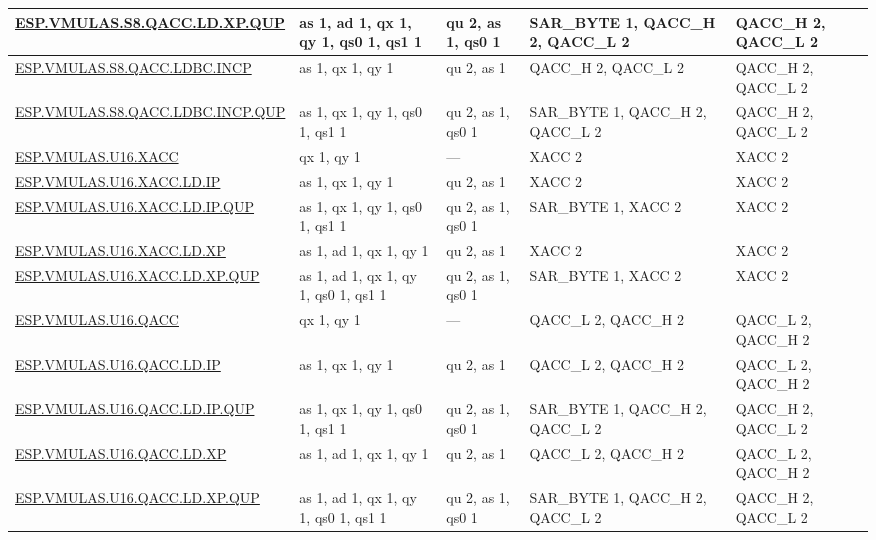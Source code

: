 \begin{longtable}[c]{|l|m{2.5cm}|m{2.5cm}|m{2.5cm}|m{2.5cm}|}
    \hyperref[instruction:ESPVMULASS8QACCLDXPQUP]{ESP.VMULAS.S8.QACC.LD.XP.QUP} & as 1, ad 1, qx 1, qy 1, qs0 1, qs1 1 & qu 2, as 1, qs0 1 & SAR\_BYTE 1, QACC\_H 2, QACC\_L 2 & QACC\_H 2, QACC\_L 2\\\hline
    \hyperref[instruction:ESPVMULASS8QACCLDBCINCP]{ESP.VMULAS.S8.QACC.LDBC.INCP} & as 1, qx 1, qy 1 & qu 2, as 1 & QACC\_H 2, QACC\_L 2 & QACC\_H 2, QACC\_L 2\\\hline
    \hyperref[instruction:ESPVMULASS8QACCLDBCINCPQUP]{ESP.VMULAS.S8.QACC.LDBC.INCP.QUP} & as 1, qx 1, qy 1, qs0 1, qs1 1 & qu 2, as 1, qs0 1 & SAR\_BYTE 1, QACC\_H 2, QACC\_L 2 & QACC\_H 2, QACC\_L 2\\\hline
    \hyperref[instruction:ESPVMULASU16XACC]{ESP.VMULAS.U16.XACC} & qx 1, qy 1 & — & XACC 2 & XACC 2\\\hline
    \hyperref[instruction:ESPVMULASU16XACCLDIP]{ESP.VMULAS.U16.XACC.LD.IP} & as 1, qx 1, qy 1 & qu 2, as 1 & XACC 2 & XACC 2\\\hline
    \hyperref[instruction:ESPVMULASU16XACCLDIPQUP]{ESP.VMULAS.U16.XACC.LD.IP.QUP} & as 1, qx 1, qy 1, qs0 1, qs1 1 & qu 2, as 1, qs0 1 & SAR\_BYTE 1, XACC 2 & XACC 2\\\hline
    \hyperref[instruction:ESPVMULASU16XACCLDXP]{ESP.VMULAS.U16.XACC.LD.XP} & as 1, ad 1, qx 1, qy 1 & qu 2, as 1 & XACC 2 & XACC 2\\\hline
    \hyperref[instruction:ESPVMULASU16XACCLDXPQUP]{ESP.VMULAS.U16.XACC.LD.XP.QUP} & as 1, ad 1, qx 1, qy 1, qs0 1, qs1 1 & qu 2, as 1, qs0 1 & SAR\_BYTE 1, XACC 2 & XACC 2\\\hline
    \hyperref[instruction:ESPVMULASU16QACC]{ESP.VMULAS.U16.QACC} & qx 1, qy 1 & — & QACC\_L 2, QACC\_H 2 & QACC\_L 2, QACC\_H 2\\\hline
    \hyperref[instruction:ESPVMULASU16QACCLDIP]{ESP.VMULAS.U16.QACC.LD.IP} & as 1, qx 1, qy 1 & qu 2, as 1 & QACC\_L 2, QACC\_H 2 & QACC\_L 2, QACC\_H 2\\\hline
    \hyperref[instruction:ESPVMULASU16QACCLDIPQUP]{ESP.VMULAS.U16.QACC.LD.IP.QUP} & as 1, qx 1, qy 1, qs0 1, qs1 1 & qu 2, as 1, qs0 1 & SAR\_BYTE 1, QACC\_H 2, QACC\_L 2 & QACC\_H 2, QACC\_L 2\\\hline
    \hyperref[instruction:ESPVMULASU16QACCLDXP]{ESP.VMULAS.U16.QACC.LD.XP} & as 1, ad 1, qx 1, qy 1 & qu 2, as 1 & QACC\_L 2, QACC\_H 2 & QACC\_L 2, QACC\_H 2\\\hline
    \hyperref[instruction:ESPVMULASU16QACCLDXPQUP]{ESP.VMULAS.U16.QACC.LD.XP.QUP} & as 1, ad 1, qx 1, qy 1, qs0 1, qs1 1 & qu 2, as 1, qs0 1 & SAR\_BYTE 1, QACC\_H 2, QACC\_L 2 & QACC\_H 2, QACC\_L 2\\\hline

\end{longtable}

